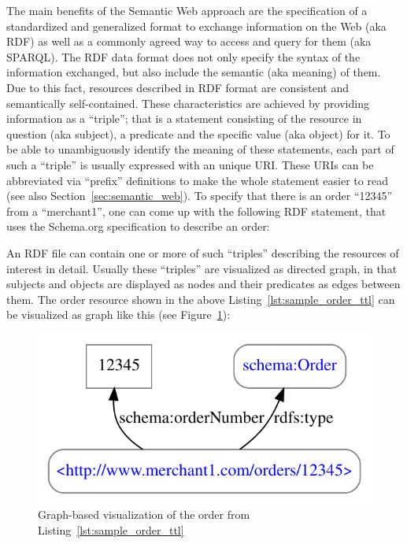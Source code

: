 The main benefits of the Semantic Web approach are the specification of a standardized and generalized format to exchange information on the Web (aka \gls{RDF}) as well as a commonly agreed way to access and query for them (aka \gls{SPARQL}). The \gls{RDF} data format does not only specify the syntax of the information exchanged, but also include the semantic (aka meaning) of them. Due to this fact, resources described in \gls{RDF} format are consistent and semantically self-contained. These characteristics are achieved by providing information as a ``triple''; that is a statement consisting of the resource in question (aka subject), a predicate and the specific value (aka object) for it. To be able to unambiguously identify the meaning of these statements, each part of such a ``triple'' is usually expressed with an unique \gls{URI}. These \gls{URI}s can be abbreviated via ``prefix'' definitions to make the whole statement easier to read (see also Section~\ref{sec:semantic_web}). To specify that there is an order ``12345'' from a ``merchant1'', one can come up with the following \gls{RDF} statement, that uses the Schema.org specification \citep{Schema.org} to describe an order: \@


An \gls{RDF} file can contain one or more of such ``triples'' describing the resources of interest in detail. Usually these ``triples'' are visualized as directed graph, in that subjects and objects are displayed as nodes and their predicates as edges between them. The order resource shown in the above Listing~\ref{lst:sample_order_ttl} can be visualized as graph like this (see Figure~\ref{fig:sample_order_graph_image}):\@

\begin{figure}[H]
  \centering
  \includegraphics[width=0.8\columnwidth]{images/sample_order_12345.pdf}
  \caption{Graph-based visualization of the order from Listing~\ref{lst:sample_order_ttl}}
\label{fig:sample_order_graph_image}
\end{figure}

